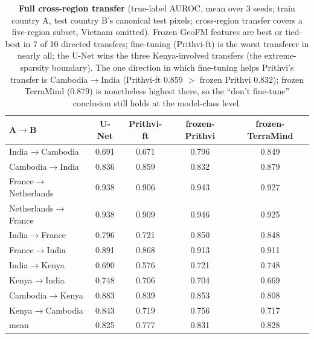 \documentclass{article}
\begin{document}
\begin{table}[h]\centering\small
\caption{\textbf{Full cross-region transfer} (true-label AUROC, mean over 3 seeds;
train country A, test country B's canonical test pixels; cross-region transfer
covers a five-region subset, Vietnam omitted). Frozen GeoFM features are best or
tied-best in 7 of 10 directed transfers; fine-tuning (Prithvi-ft) is the worst
transferer in nearly all; the U-Net wins the three Kenya-involved transfers (the
extreme-sparsity boundary). The one direction in which fine-tuning helps Prithvi's
transfer is Cambodia$\rightarrow$India (Prithvi-ft 0.859 $>$ frozen Prithvi 0.832);
frozen TerraMind (0.879) is nonetheless highest there, so the ``don't fine-tune''
conclusion still holds at the model-class level.}
\label{tab:xfer-full}
\begin{tabular}{lcccc}
\toprule
A$\rightarrow$B & U-Net & Prithvi-ft & frozen-Prithvi & frozen-TerraMind \\
\midrule
India$\rightarrow$Cambodia      & 0.691 & 0.671 & 0.796 & 0.849 \\
Cambodia$\rightarrow$India      & 0.836 & 0.859 & 0.832 & 0.879 \\
France$\rightarrow$Netherlands  & 0.938 & 0.906 & 0.943 & 0.927 \\
Netherlands$\rightarrow$France  & 0.938 & 0.909 & 0.946 & 0.925 \\
India$\rightarrow$France        & 0.796 & 0.721 & 0.850 & 0.848 \\
France$\rightarrow$India        & 0.891 & 0.868 & 0.913 & 0.911 \\
India$\rightarrow$Kenya         & 0.690 & 0.576 & 0.721 & 0.748 \\
Kenya$\rightarrow$India         & 0.748 & 0.706 & 0.704 & 0.669 \\
Cambodia$\rightarrow$Kenya      & 0.883 & 0.839 & 0.853 & 0.808 \\
Kenya$\rightarrow$Cambodia      & 0.843 & 0.719 & 0.756 & 0.717 \\
\midrule
mean & 0.825 & 0.777 & 0.831 & 0.828 \\
\bottomrule
\end{tabular}
\end{table}
\end{document}
